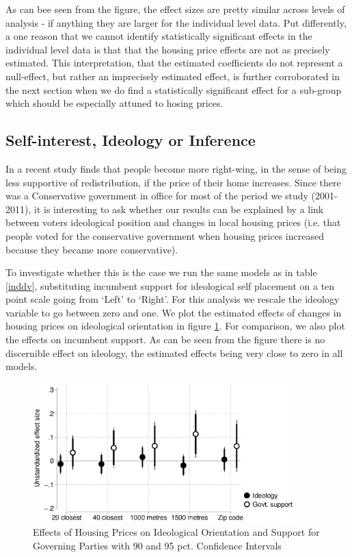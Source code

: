 \documentclass[12pt,a4paper]{article}
\begin{document}
As can bee seen from the figure, the effect sizes are pretty similar across levels of analysis - if anything they are larger for the individual level data. Put differently, a one reason that we cannot identify statistically significant effects in the individual level data is that that the housing price effects are not as precisely estimated. This interpretation, that the estimated coefficients do not represent a null-effect, but rather an imprecisely estimated effect, is further corroborated in the next section when we do find a statistically significant effect for a sub-group which should be especially attuned to hosing prices.

\subsection{Self-interest, Ideology or Inference}\label{inference}

In a recent study \cite{ansell2014political} finds that people become more right-wing, in the sense of being less supportive of redistribution, if the price of their home increases. Since there was a Conservative government in office for most of the period we study (2001-2011), it is interesting to ask whether our results can be explained by a link between voters ideological position and changes in local housing prices (i.e. that people voted for the conservative government when housing prices increased because they became more conservative).

To investigate whether this is the case we run the same models as in table \ref{inddv}, substituting incumbent support for ideological self placement on a ten point scale going from `Left' to `Right'. For this analysis we rescale the ideology variable to go between zero and one. We plot the estimated effects of changes in housing prices on ideological orientation in figure \ref{ideology}. For comparison, we also plot the effects on incumbent support. As can be seen from the figure there is no discernible effect on ideology, the estimated effects being very close to zero in all models.


\begin{figure}[htbp!]
	\includegraphics[width=0.9\textwidth]{../figures/ideology.eps}
	\centering
	\caption{Effects of Housing Prices on Ideological Orientation and Support for Governing Parties with 90  and 95 pct. Confidence Intervals}\label{ideology}
\end{figure}
\end{document}

